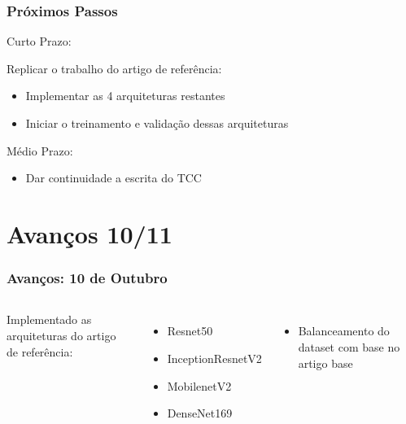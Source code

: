 \documentclass[aspectratio=169]{beamer}
\begin{document}
\begin{frame}
    \frametitle{Próximos Passos}

    \begin{block}{Curto Prazo:}

        Replicar o trabalho do artigo de referência:
        \begin{itemize}
            \item Implementar as 4 arquiteturas restantes
            \item Iniciar o treinamento e validação dessas arquiteturas
        \end{itemize}

    \end{block}



    \begin{block}{Médio Prazo:}

        \begin{itemize}
            \item Dar continuidade a escrita do TCC
        \end{itemize}

    \end{block}




\end{frame}


\section{Avanços 10/11}


\begin{frame}
    \frametitle{Avanços: 10 de Outubro}
    \begin{columns}



        Implementado as arquiteturas do artigo de referência:

        \begin{itemize}
            \item Resnet50
            \item InceptionResnetV2
            \item MobilenetV2
            \item DenseNet169
        \end{itemize}


        \begin{itemize}
            \item Balanceamento do dataset com base no artigo base
        \end{itemize}


    \end{columns}

\end{frame}
\end{document}

